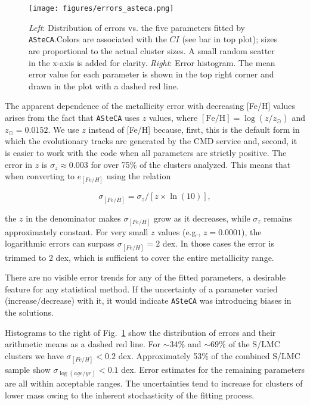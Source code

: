 \documentclass{aa}
\begin{document}
\begin{figure}[!ht]
\centering
\texttt{[image: figures/errors\_asteca.png]}
\caption{\emph{Left}: Distribution of errors vs. the five parameters fitted
by \texttt{ASteCA}.\@ Colors are associated with the $CI$ (see bar in top plot);
sizes are proportional to the actual cluster sizes. A small random scatter in
the x-axis is added for clarity.
\emph{Right}: Error histogram. The mean error value for each parameter is shown
in the top right corner and drawn in the plot with a dashed red line.}
\label{fig:errors}
\end{figure}

The apparent dependence of the metallicity error with decreasing [Fe/H] values
arises from the fact that \texttt{ASteCA} uses $z$ values, where
$\mathrm{[Fe/H]}{=}\log(z/z_{\odot})$ and  $z_{\odot}{=}0.0152$. We use $z$
instead of [Fe/H] because, first, this is the default form in which the evolutionary
tracks are generated by the CMD service and, second, it is easier to work with the
code when all parameters are strictly positive.
The error in $z$ is $\sigma_z{\approx}0.003$ for over 75\% of the clusters
analyzed. This means that when converting to $e_{[Fe/H]}$ using the relation

\begin{equation}
\sigma_{[Fe/H]} = \sigma_z/[z\times\ln(10)],
\end{equation}

\noindent the $z$ in the denominator makes $\sigma_{[Fe/H]}$ grow as it
decreases, while $\sigma_z$ remains approximately constant.
For very small $z$ values (e.g., $z{=}0.0001$), the logarithmic errors can
surpass $\sigma_{[Fe/H]}{=}2$ dex. In those cases the error is trimmed to 2 dex,
which is sufficient to cover the entire metallicity range.

There are no visible error trends for any of the fitted parameters, a desirable
feature for any statistical method. If the uncertainty of a parameter varied 
(increase/decrease) with it, it would indicate \texttt{ASteCA} was
introducing biases in the solutions.

Histograms to the right of Fig.~\ref{fig:errors} show the distribution
of errors and their arithmetic means as a dashed red line.
For $\sim$34\% and ${\sim}69\%$ of the S/LMC clusters we have
$\sigma_{[Fe/H]}{<}0.2$ dex.
Approximately 53\% of the combined S/LMC sample show
$\sigma_{\log(age/yr)}{<}0.1$ dex. Error estimates for the remaining parameters
are all within acceptable ranges. The uncertainties tend to increase for
clusters of lower mass owing to the inherent stochasticity of the fitting
process.\\
\end{document}
